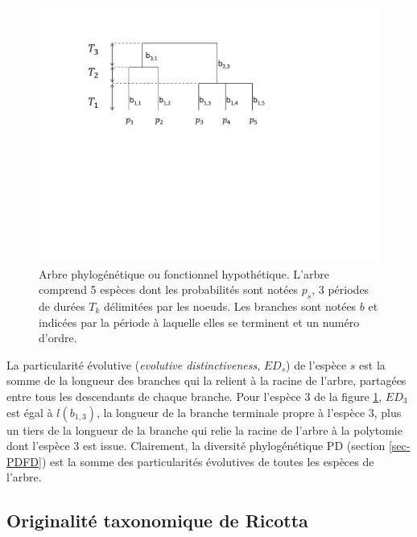 \documentclass[
  11pt,
  french,
  a4paper,
  extrafontsizes,onecolumn,openright
  ]{memoir}
\begin{document}
\begin{figure}

{\centering \includegraphics[width=0.8\linewidth]{images/ArbreA} 

}

\caption{Arbre phylogénétique ou fonctionnel hypothétique. L'arbre comprend 5 espèces dont les probabilités sont notées \(p_s\), 3 périodes de durées \(T_k\) délimitées par les noeuds. Les branches sont notées \(b\) et indicées par la période à laquelle elles se terminent et un numéro d'ordre.}\label{fig:ArbreA4}
\end{figure}

\normalsize

La particularité évolutive \autocite{Isaac2007} (\emph{evolutive distinctiveness}, \(\mathit{ED}_s\)) de l'espèce \(s\) est la somme de la longueur des branches qui la relient à la racine de l'arbre, partagées entre tous les descendants de chaque branche.
Pour l'espèce 3 de la figure \ref{fig:ArbreA4}, \(\mathit{ED}_3\) est égal à \(l(b_{1,3})\), la longueur de la branche terminale propre à l'espèce 3, plus un tiers de la longueur de la branche qui relie la racine de l'arbre à la polytomie dont l'espèce 3 est issue.
Clairement, la diversité phylogénétique PD (section \ref{sec-PDFD}) est la somme des particularités évolutives de toutes les espèces de l'arbre.

\hypertarget{sec-OrigTax}{%
\subsection{Originalité taxonomique de Ricotta}\label{sec-OrigTax}}



\scriptsize
\end{document}
